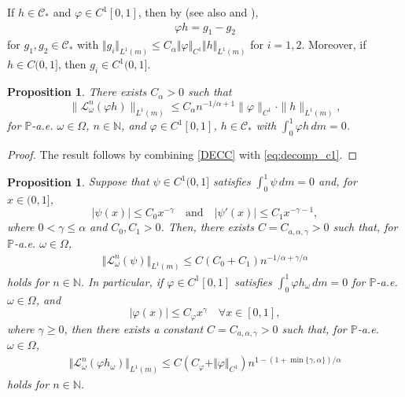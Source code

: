 \documentclass[12pt,reqno,a4paper]{article}
\newcommand\cL{{\mathcal L}}
\newcommand\bP{{\mathbb P}}
\newcommand\cC{{\mathcal C}}
\newtheorem{proposition}[theorem]{Proposition}
\begin{document}
	If $h\in \mathcal C_*$ and $\varphi \in C^1[0, 1]$, then by 
	\cite[Lemma 3.3]{LS} (see also \cite[Remark 2.5]{NTV} and \cite[Lemma 3.4]{NPT}), 
	\begin{align}\label{eq:decomp_c1}
		\varphi h = g_1 - g_2 
	\end{align}
	for $g_1,g_2 \in \cC_*$ with $\Vert g_i \Vert_{L^1(m)} \le C_\alpha \Vert \varphi \Vert_{C^1} \Vert h \Vert_{L^1(m)}$ for $i = 1,2$. Moreover, if $h \in C(0,1]$, then $g_i \in C^1(0,1]$.
	
	\begin{proposition}
		There exists $C_\alpha>0$ such that 
		\begin{equation}\label{dec}
			\|\mathcal L_\omega^n (\varphi h)\|_{L^1(m)} \le C_\alpha n^{-1/\alpha+1}\|\varphi \|_{C^1} \cdot \|h\|_{L^1(m)},
		\end{equation}
		for $\mathbb P$-a.e. $\omega \in \Omega$,  $n\in \mathbb N$, and $\varphi \in C^1[0, 1]$, $h\in \mathcal C_*$ with
		$\int_0^1 \varphi h\, dm=0$.
	\end{proposition}
	
	\begin{proof} 
		The result follows by combining 
		\eqref{DECC}
		with \eqref{eq:decomp_c1}.
	\end{proof}
	
	\begin{proposition} Suppose that $\psi \in C^1(0,1]$ satisfies 
		$\int_0^1 \psi \, d m = 0$ and, for $x \in (0,1]$,
		$$
		|\psi(x)| \le C_{0} x^{-\gamma} \quad 
		\text{and} \quad 
		|\psi'(x)| \le C_{1} x^{-\gamma - 1},
		$$
		where $0 < \gamma \le \alpha$ and $C_0,C_1 > 0$.
		Then, there exists $C=C_{a, \alpha, \gamma}>0$
		such that, for $\bP$-a.e. $\omega \in \Omega$, 
		\begin{align}\label{eq:fast_ml_1}
			\Vert \cL_\omega^n (  \psi ) \Vert_{L^1(m)} \le C(C_{0} + C_{ 1})
			n^{-1/\alpha + \gamma/ \alpha}
		\end{align}
		holds for $n \in \mathbb{N}$. In particular, if $\varphi \in C^1[0, 1]$ satisfies
		$\int_0^1 \varphi h_\omega \, dm = 0$ for $\bP$-a.e. $\omega \in \Omega$, 
		and 
		$$
		|\varphi(x)| \le C_\varphi x^{\gamma} \quad \forall x \in [0,1], 
		$$
		where $\gamma \ge 0$, 
		then there exists a constant 
		$C=C_{a, \alpha, \gamma} > 0$ 
		such that, for $\bP$-a.e. $\omega \in \Omega$, 
		\begin{align}\label{eq:fast_ml_2}
			\Vert \cL_\omega^n ( \varphi h_\omega  ) \Vert_{L^1(m)} \le C ( C_\varphi + \Vert \varphi \Vert_{C^1}  ) n^{ 1 - (1 +  \min\{ \gamma, \alpha \} )/\alpha}
		\end{align}
		holds for $n \in \mathbb{N}$.
	\end{proposition}
	
\end{document}
